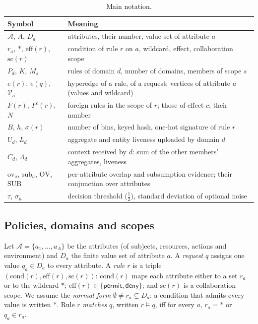 \documentclass[preprint,12pt]{elsarticle}
\theoremstyle{definition}
\newcommand{\eff}{\mathrm{eff}}
\newcommand{\scp}{\mathrm{sc}}
\begin{document}
\begin{table}[t]
\caption{Main notation.}
\label{tab:notation}
\centering\footnotesize
\begin{tabularx}{\linewidth}{@{}lX@{}}
\toprule
Symbol & Meaning\\
\midrule
$\mathcal{A}$, $A$, $D_a$ & attributes, their number, value set of attribute $a$\\
$r_a$, $\ast$, $\eff(r)$, $\scp(r)$ & condition of rule $r$ on $a$, wildcard, effect, collaboration scope\\
$P_d$, $K$, $M_s$ & rules of domain $d$, number of domains, members of scope $s$\\
$e(r)$, $e(q)$, $\mathcal{V}_a$ & hyperedge of a rule, of a request; vertices of attribute $a$ (values and wildcard)\\
$F(r)$, $F^{c}(r)$, $N$ & foreign rules in the scope of $r$; those of effect $c$; their number\\
$B$, $h$, $\sigma(r)$ & number of bins, keyed hash, one-hot signature of rule $r$\\
$U_d$, $L_d$ & aggregate and entity liveness uploaded by domain $d$\\
$C_d$, $\Lambda_d$ & context received by $d$: sum of the other members' aggregates, liveness\\
$\mathrm{ov}_a$, $\mathrm{sub}_a$, $\mathrm{OV}$, $\mathrm{SUB}$ & per-attribute overlap and subsumption evidence; their conjunction over attributes\\
$\tau$, $\sigma_{\!n}$ & decision threshold ($\tfrac12$), standard deviation of optional noise\\
\bottomrule
\end{tabularx}
\end{table}

\subsection{Policies, domains and scopes}
Let $\mathcal{A}=\{a_1,\dots,a_A\}$ be the attributes (of subjects, resources, actions and environment) and $D_a$ the finite value set of attribute $a$. A \emph{request} $q$ assigns one value $q_a\in D_a$ to every attribute. A \emph{rule} $r$ is a triple $(\mathrm{cond}(r),\eff(r),\scp(r))$: $\mathrm{cond}(r)$ maps each attribute either to a set $r_a$ or to the wildcard $\ast$; $\eff(r)\in\{\textsf{permit},\textsf{deny}\}$; and $\scp(r)$ is a collaboration scope. We assume the \emph{normal form} $\emptyset\neq r_a\subsetneq D_a$: a condition that admits every value is written $\ast$. Rule $r$ \emph{matches} $q$, written $r\models q$, iff for every $a$, $r_a=\ast$ or $q_a\in r_a$.
\end{document}
